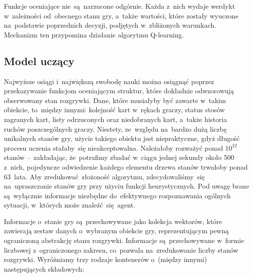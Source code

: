 \documentclass[declaration,shortabstract,inz]{iithesis}
\begin{document}
Funkcje oceniające nie~są~narzucone odgórnie. Każda z~nich wydaje werdykt w~zależności od~obecnego stanu gry, a~także wartości, które zostały wyuczone na~podstawie poprzednich decyzji, podjętych w~zbliżonych warunkach. Mechanizm ten przypomina działanie algorytmu Q-learning\cite{Q-learning}.

\subsection*{Model uczący}

Najwyższe osiągi i~największą swobodę nauki można osiągnąć poprzez przekazywanie funkcjom oceniającym struktur, które dokładnie odwzorowują obserwowany stan rozgrywki. Dane, które musiałyby być zawarte w~takim obiekcie, to~między innymi: kolejność kart w~rękach graczy, status stosów zagranych kart, listy odrzuconych oraz niedobranych kart, a~także historia ruchów poszczególnych graczy. Niestety, ze~względu na~bardzo dużą liczbę unikalnych stanów gry, użycie takiego obiektu jest niepraktyczne, gdyż długość procesu uczenia stałaby~się nieakceptowalna. Należałoby rozważyć ponad $10^{12}$ stanów --~zakładając, że~potrafimy zbadać w~ciągu jednej sekundy około 500 z~nich, pojedyncze odwiedzenie każdego elementu drzewa stanów trwałoby ponad 63~lata. Aby zredukować złożoność algorytmu, zdecydowaliśmy~się na~upraszczanie stanów gry przy użyciu funkcji heurystycznych. Pod uwagę brane są~wyłącznie informacje niezbędne do~efektywnego rozpoznawania ogólnych sytuacji, w~których może znaleźć~się agent.

Informacje o~stanie gry są~przechowywane jako kolekcja wektorów, które zawierają zestaw danych o~wybranym obiekcie gry, reprezentującym pewną ograniczoną abstrakcję stanu rozgrywki. Informacje są~przechowywane w~formie liczbowej z~ograniczonego zakresu, co~pozwala na~zredukowanie liczby stanów rozgrywki. Wyróżniamy trzy rodzaje kontenerów o~(między innymi) następujących składowych:
\end{document}
